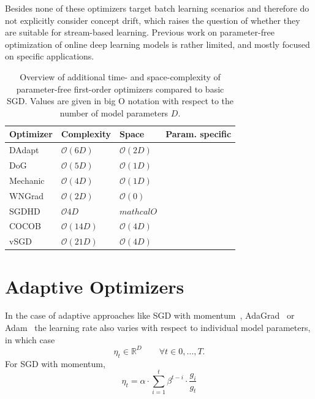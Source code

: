 \documentclass[letterpaper]{article} %
\newcommand{\cmark}{\ding{51}} %
\newcommand{\xmark}{\ding{55}} %
\begin{document}
Besides \citet{schaulNoMorePesky2013} none of these optimizers target batch learning scenarios and therefore do not explicitly consider concept drift, which raises the question of whether they are suitable for stream-based learning.
Previous work on parameter-free optimization of online deep learning models is rather limited, and mostly focused on specific applications.

\begin{table}[]
	\centering
	\begin{tabular}{@{}lllc@{}}
		\toprule
		Optimizer & Complexity                      & Space             & Param. specific \\ \midrule
		DAdapt    & $\mathcal{O}(6D)$               & $\mathcal{O}(2D)$ & \xmark          \\
		DoG       & $\mathcal{O}(5D)$               & $\mathcal{O}(1D)$ & \xmark          \\
		Mechanic  & $\mathcal{O}(4D)$               & $\mathcal{O}(1D)$ & \xmark          \\
		WNGrad    & $\mathcal{O}(2D)$               & $\mathcal{O}(0)$  & \xmark          \\
		SGDHD     & $\mathcal{O}{4D}$               & $mathcal{O}{}$    & \xmark          \\
		COCOB     & $\mathcal{O}(14D)$              & $\mathcal{O}(4D)$ & \cmark          \\
		vSGD      & $\mathcal{O}(21D)$\footnotemark & $\mathcal{O}(4D)$ & \cmark          \\
		\bottomrule
	\end{tabular}
	\caption{Overview of additional time- and space-complexity of parameter-free first-order optimizers compared to basic SGD. Values are given in big O notation with respect to the number of model parameters $D$.}\label{tab:param_free_optims}
\end{table}

\section{Adaptive Optimizers}\label{sec:adaptive_optims}

In the case of adaptive approaches like SGD with momentum~\cite{rumelhartLearningRepresentationsBackpropagating1986a}, AdaGrad~\cite{duchiAdaptiveSubgradientMethods2011} or Adam~\cite{kingmaAdamMethodStochastic2017b} the learning rate also varies with respect to individual model parameters, in which case
\begin{equation}
	\eta_t \in \mathbb{R}^{D} \qquad \forall t \in 0,\ldots,T.
\end{equation}
For SGD with momentum,
\begin{equation}
	\eta_t = \alpha \cdot \sum_{i=1}^{t} \beta^{t-i} \cdot \frac{g_i}{g_t}
\end{equation}
\end{document}
